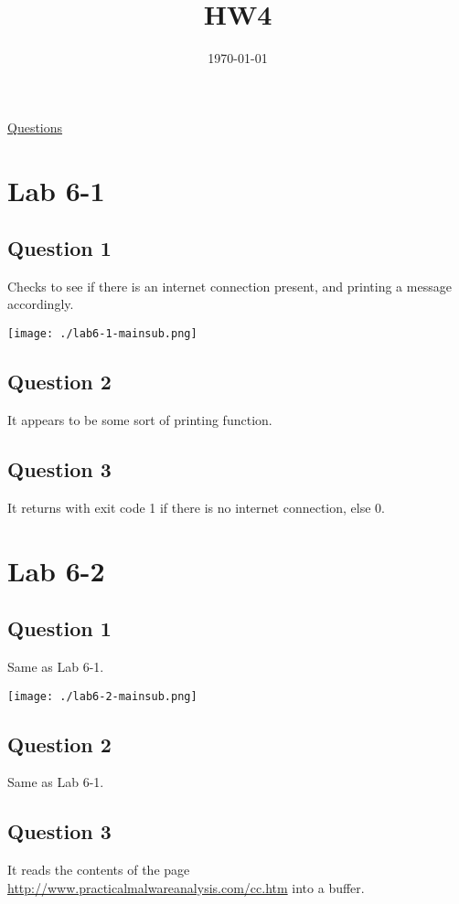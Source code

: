 \documentclass[11pt]{article}
\date{\today}
\title{HW4}
\begin{document}
\maketitle
\tableofcontents

\href{https://docs.google.com/document/d/1lYViOnBkWpGtFUB4LzteoEvrtec5kBMcOVtUTJ0GxW4/edit}{Questions}
\section{Lab 6-1}
\label{sec:org06a2d99}
\subsection{Question 1}
\label{sec:org283b601}
Checks to see if there is an internet connection present, and printing
a message accordingly.

\begin{center}
\texttt{[image: ./lab6-1-mainsub.png]}
\end{center}
\subsection{Question 2}
\label{sec:org5066640}
It appears to be some sort of printing function.
\subsection{Question 3}
\label{sec:org312ede5}
It returns with exit code 1 if there is no internet connection,
else 0.
\section{Lab 6-2}
\label{sec:org0e67210}
\subsection{Question 1}
\label{sec:org5e6147b}
Same as Lab 6-1.

\begin{center}
\texttt{[image: ./lab6-2-mainsub.png]}
\end{center}
\subsection{Question 2}
\label{sec:org470bc5c}
Same as Lab 6-1.
\subsection{Question 3}
\label{sec:org7fa77b9}
It reads the contents of the page
\url{http://www.practicalmalwareanalysis.com/cc.htm} into a buffer.
\end{document}
